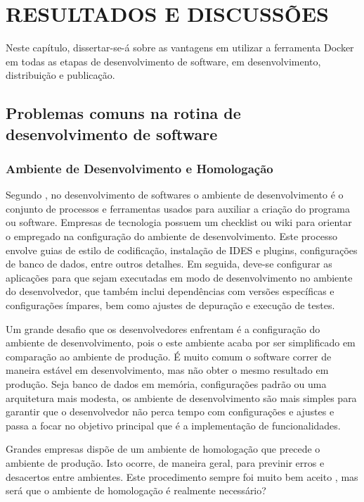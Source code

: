\documentclass[
	12pt,				%
	openright,			%
	oneside,			%
	a4paper,			%
	chapter=TITLE,		%
	section=TITLE,		%
	english,			%
	french,				%
	spanish,			%
	brazil				%
	]{abntex2}
\begin{document}
\chapter{RESULTADOS E DISCUSSÕES}

Neste capítulo, dissertar-se-á sobre as vantagens em utilizar a ferramenta Docker em todas as etapas de desenvolvimento de software, em desenvolvimento, distribuição e publicação.

\section{Problemas comuns na rotina de desenvolvimento de software}

\subsection{Ambiente de Desenvolvimento e Homologação}

Segundo , no desenvolvimento de softwares o ambiente de desenvolvimento é o conjunto de processos e ferramentas usados para auxiliar a criação do programa ou software. Empresas de tecnologia possuem um checklist ou wiki para orientar o empregado na configuração do ambiente de desenvolvimento. Este processo envolve guias de estilo de codificação, instalação de IDES e plugins, configurações de banco de dados, entre outros detalhes. Em seguida, deve-se configurar as aplicações para que sejam executadas em modo de desenvolvimento no ambiente do desenvolvedor, que também inclui dependências com versões específicas e configurações ímpares, bem como ajustes de depuração e execução de testes.

Um grande desafio que os desenvolvedores enfrentam é a configuração do ambiente de desenvolvimento, pois o este ambiente acaba por ser simplificado em comparação ao ambiente de produção. É muito comum o software correr de maneira estável em desenvolvimento, mas não obter o mesmo resultado em produção. Seja banco de dados em memória, configurações padrão ou uma arquitetura mais modesta, os ambiente de desenvolvimento são mais simples para garantir que o desenvolvedor não perca tempo com configurações e ajustes e passa a focar no objetivo principal que é a implementação de funcionalidades. 

Grandes empresas dispõe de um ambiente de homologação que precede o ambiente de produção. Isto ocorre, de maneira geral, para previnir erros e desacertos entre ambientes. Este procedimento sempre foi muito bem aceito , mas será que o ambiente de homologação é realmente necessário?
\end{document}
